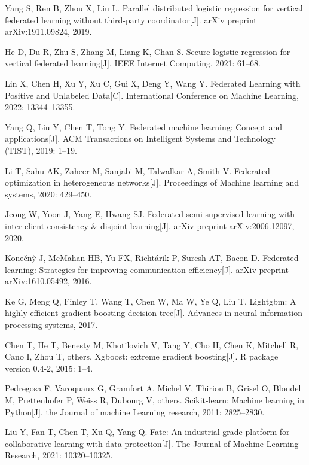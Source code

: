 \begin{thebibliography}{200}
	Yang S, Ren B, Zhou X, Liu L. Parallel distributed logistic regression for vertical federated learning without third-party coordinator[J]. arXiv preprint arXiv:1911.09824, 2019.
	
	He D, Du R, Zhu S, Zhang M, Liang K, Chan S. Secure logistic regression for vertical federated learning[J]. IEEE Internet Computing, 2021: 61--68.
	
	Lin X, Chen H, Xu Y, Xu C, Gui X, Deng Y, Wang Y. Federated Learning with Positive and Unlabeled Data[C]. International Conference on Machine Learning, 2022: 13344--13355.
	
	Yang Q, Liu Y, Chen T, Tong Y. Federated machine learning: Concept and applications[J]. ACM Transactions on Intelligent Systems and Technology (TIST), 2019: 1--19.
	
	Li T, Sahu AK, Zaheer M, Sanjabi M, Talwalkar A, Smith V. Federated optimization in heterogeneous networks[J]. Proceedings of Machine learning and systems, 2020: 429--450.
	
	Jeong W, Yoon J, Yang E, Hwang SJ. Federated semi-supervised learning with inter-client consistency \& disjoint learning[J]. arXiv preprint arXiv:2006.12097, 2020.
	
	Kone{\v{c}}n{\`y} J, McMahan HB, Yu FX, Richt{\'a}rik P, Suresh AT, Bacon D. Federated learning: Strategies for improving communication efficiency[J]. arXiv preprint arXiv:1610.05492, 2016.
	
	Ke G, Meng Q, Finley T, Wang T, Chen W, Ma W, Ye Q, Liu T. Lightgbm: A highly efficient gradient boosting decision tree[J]. Advances in neural information processing systems, 2017.
	
	Chen T, He T, Benesty M, Khotilovich V, Tang Y, Cho H, Chen K, Mitchell R, Cano I, Zhou T, others. Xgboost: extreme gradient boosting[J]. R package version 0.4-2, 2015: 1--4.
	
	Pedregosa F, Varoquaux G, Gramfort A, Michel V, Thirion B, Grisel O, Blondel M, Prettenhofer P, Weiss R, Dubourg V, others. Scikit-learn: Machine learning in Python[J]. the Journal of machine Learning research, 2011: 2825--2830.
	
	Liu Y, Fan T, Chen T, Xu Q, Yang Q. Fate: An industrial grade platform for collaborative learning with data protection[J]. The Journal of Machine Learning Research, 2021: 10320--10325.
	

\end{thebibliography}
